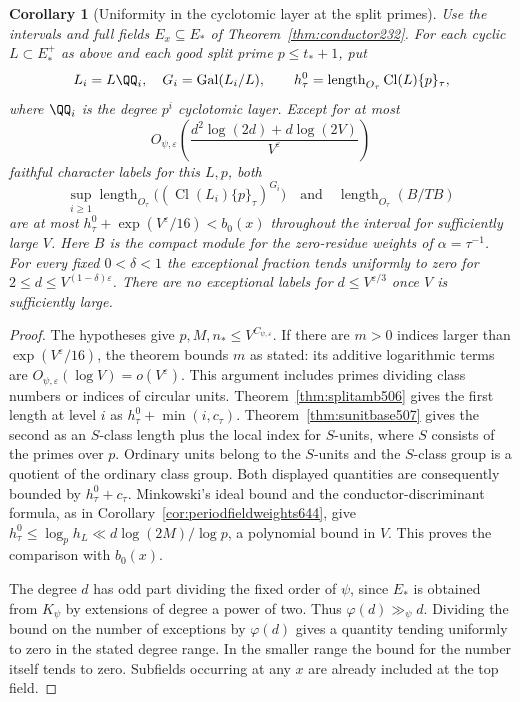 \documentclass[a4paper,11pt]{article}
\newtheorem{corollary}[proposition]{Corollary}
\theoremstyle{definition}
\theoremstyle{remark}
\numberwithin{equation}{section}
\newcommand{\Cl}{\operatorname{Cl}}
\begin{document}
\begin{corollary}[Uniformity in the cyclotomic layer at the split primes]
\leavevmode\label{cor:splitlayers646}
Use the intervals and full fields \(E_x\subseteq E_*\) of
Theorem~\ref{thm:conductor232}. For each cyclic \(L\subset E_*^+\)
as above and each good split prime \(p\le t_*+1\), put
\[
 L_i=L\QQ_i,\quad G_i=\operatorname{Gal}(L_i/L),\qquad
 h_\tau^0=\operatorname{length}_{O_\tau}\Cl(L)\{p\}_\tau ,
\]
where \(\QQ_i\) is the degree \(p^i\) cyclotomic layer.
Except for at most
\[
         O_{\psi,\varepsilon}\!
         \left(\frac{d^2\log(2d)+d\log(2V)}{V^\varepsilon}\right)
\]
faithful character labels for this \(L,p\), both
\[
 \sup_{i\ge1}\operatorname{length}_{O_\tau}
                  \big((\Cl(L_i)\{p\}_\tau)^{G_i}\big)
 \quad\text{and}\quad
 \operatorname{length}_{O_\tau}(B/TB)
\]
are at most \(h_\tau^0+\exp(V^\varepsilon/16)<b_0(x)\)
throughout the interval for sufficiently large \(V\).
Here \(B\) is the compact module for the zero-residue weights
of \(\alpha=\tau^{-1}\). For every fixed \(0<\delta<1\) the
exceptional fraction tends uniformly to zero for
\(2\le d\le V^{(1-\delta)\varepsilon}\).
There are no exceptional labels for \(d\le V^{\varepsilon/3}\)
once \(V\) is sufficiently large.
\end{corollary}
\begin{proof}
The hypotheses give \(p,M,n_*\le V^{C_{\psi,\varepsilon}}\).
If there are \(m>0\) indices larger than
\(\exp(V^\varepsilon/16)\), the theorem bounds \(m\) as
stated: its additive logarithmic terms are \(O_{\psi,\varepsilon}
(\log V)=o(V^\varepsilon)\). This argument includes primes
dividing class numbers or indices of circular units.
Theorem~\ref{thm:splitamb506} gives the first length at level
\(i\) as \(h_\tau^0+\min(i,c_\tau)\).
Theorem~\ref{thm:sunitbase507} gives the second as an
\(S\)-class length plus the local index for \(S\)-units,
where \(S\) consists of the primes over \(p\). Ordinary units
belong to the \(S\)-units and the \(S\)-class group is a
quotient of the ordinary class group. Both displayed
quantities are consequently bounded by \(h_\tau^0+c_\tau\).
Minkowski's ideal bound and the conductor-discriminant
formula, as in Corollary~\ref{cor:periodfieldweights644}, give
\(h_\tau^0\le\log_p h_L\ll d\log(2M)/\log p\), a polynomial
bound in \(V\). This proves the comparison with \(b_0(x)\).

The degree \(d\) has odd part dividing the fixed order of
\(\psi\), since \(E_*\) is obtained from \(K_\psi\) by
extensions of degree a power of two. Thus
\(\varphi(d)\gg_\psi d\). Dividing the bound on the number
of exceptions by \(\varphi(d)\) gives a quantity tending
uniformly to zero in the stated degree range. In the
smaller range the bound for the number itself tends to
zero. Subfields occurring at any \(x\) are already
included at the top field.
\end{proof}
\end{document}
